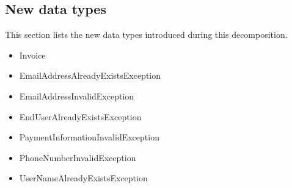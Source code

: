 \subsection{New data types}
    This section lists the new data types introduced during this decomposition.

    \begin{itemize}
        \item Invoice
        \item EmailAddressAlreadyExistsException
        \item EmailAddressInvalidException
        \item EndUserAlreadyExistsException
        \item PaymentInformationInvalidException
        \item PhoneNumberInvalidException
        \item UserNameAlreadyExistsException
    \end{itemize}
